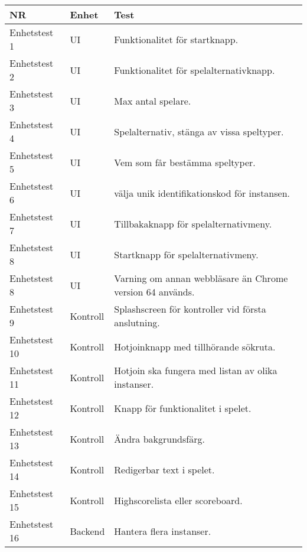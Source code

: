 \documentclass[10pt]{article}
\begin{document}
	\begin{tabular}{| p{2.1cm}| p{2cm} | p{8cm}|}
	
      \hline
      NR&Enhet&Test\\
      \hline
    
		Enhetstest 1&UI&Funktionalitet för startknapp.\\
		\hline
		Enhetstest 2&UI&Funktionalitet för spelalternativknapp.\\
		\hline
		Enhetstest 3&UI&Max antal spelare.\\
		\hline
		Enhetstest 4&UI&Spelalternativ, stänga av vissa speltyper.\\
		\hline
		Enhetstest 5&UI&Vem som får bestämma speltyper.\\
		\hline
		Enhetstest 6&UI&välja unik identifikationskod för instansen.\\
		\hline
		Enhetstest 7&UI&Tillbakaknapp för spelalternativmeny.\\
		\hline
		Enhetstest 8&UI&Startknapp för spelalternativmeny.\\
		\hline
		Enhetstest 8&UI&Varning om annan webbläsare än Chrome version 64 används.\\
		\hline
		Enhetstest 9&Kontroll&Splashscreen för kontroller vid första anslutning.\\
		\hline
		Enhetstest 10&Kontroll&Hotjoinknapp med tillhörande sökruta.\\
		\hline
		Enhetstest 11&Kontroll&Hotjoin ska fungera med listan av olika instanser.\\
		\hline
		Enhetstest 12&Kontroll&Knapp för funktionalitet i spelet.\\
		\hline
		Enhetstest 13&Kontroll&Ändra bakgrundsfärg.\\
		\hline
		Enhetstest 14&Kontroll&Redigerbar text i spelet.\\
		\hline
		Enhetstest 15&Kontroll&Highscorelista eller scoreboard.\\
		\hline
		Enhetstest 16&Backend&Hantera flera instanser.\\
		\hline



   
  \end{tabular}
\end{document}
